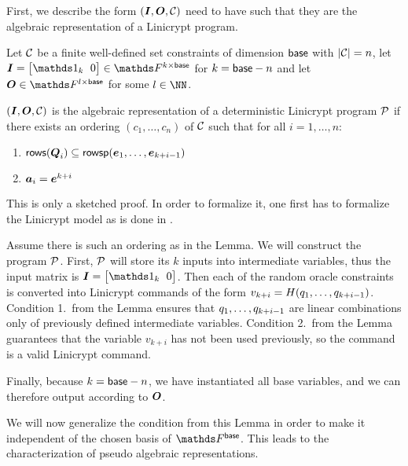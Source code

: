 First, we describe the form $(\I, \O, \C)$ need to have such that they are the algebraic representation of a Linicrypt program.
\begin{lemma}
\label{is_algebraic_repr}
    Let $\C$ be a finite well-defined set constraints of dimension $\base$ with $|\C| = n$,
    let $\I = \m{\Id_k & 0} \in \F^{k\times\base}$ for $k = \base - n$
    and let $\O \in \F^{l \times \base}$ for some $l \in \NN$.
       
    $(\I, \O, \C)$ is the algebraic representation of a deterministic Linicrypt program $\P$
    if there exists an ordering $(c_1, \dots, c_n)$ of $\C$
    such that for all $i=1, \dots, n$:
    \begin{enumerate}
    \item
    $\rows(\Q_i) \subseteq \rowsp(\dts \ve {k+i-1})$
    \item
    $\va_i = \ve^{k+i}$
    \end{enumerate}
\end{lemma}

\begin{sketch}
    This is only a sketched proof.
    In order to formalize it, one first has to formalize the Linicrypt model as is done in \cite{C:CarRos16}.

    Assume there is such an ordering as in the Lemma.
    We will construct the program $\P$.
    First, $\P$ will store its $k$ inputs into intermediate variables,
    thus the input matrix is $\I = \m{\Id_k & 0}$.
    Then each of the random oracle constraints is converted into Linicrypt commands of the form
    $v_{k+i} = H(\dts q {k+i-1})$.
    Condition 1.~from the Lemma ensures that $\dts q {k+i-1}$ are linear combinations only of previously defined intermediate variables.  
    Condition 2.~from the Lemma guarantees that the variable $v_{k+i}$ has not been used previously,
    so the command is a valid Linicrypt command.
    
    Finally, because $k=\base - n$, we have instantiated all base variables,
    and we can therefore output according to $\O$.
\end{sketch}

We will now generalize the condition from this Lemma in order to make it independent of the chosen basis of $\Fsp$.
This leads to the characterization of pseudo algebraic representations.

